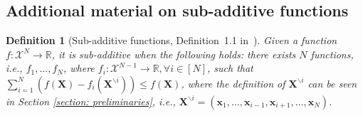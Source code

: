 \documentclass{article}
\def\sR{\mathbb{R}}
\def\vx{{\mathbf{x}}}
\def\mX{{\mathbf{X}}}
\def\eE{\mathbb{E}}
\newtheorem{definition}{Definition}
\begin{document}
\subsection{Additional material on sub-additive functions}
\label{sec_app:material_sub_additive}
\begin{definition}[Sub-additive functions, Definition~1.1 in~\cite{bousquet2003concentration}]
\label{def:sub-additive appendix}
    Given a function $f: \mathcal{X}^N \rightarrow \sR$, it is sub-additive when the following holds: 
    there exists $N$ functions, i.e., $ f_1,\dots, f_N$, where $f_i : \mathcal{X}^{N-1} \rightarrow \sR, \forall i \in [N]$, such that $\sum_{i=1}^N \left( f (\mX) - f_i (\mX^{\backslash{i}}) \right) \leq f (\mX)$, where the definition of  $\mX^{\backslash{i}}$ can be seen in Section \ref{section: preliminaries}, i.e., $\mX^{\backslash{i}} = (\vx_1, \dots, \vx_{i-1}, \vx_{i+1}, \dots, \vx_N)$. 
\end{definition}

\end{document}
